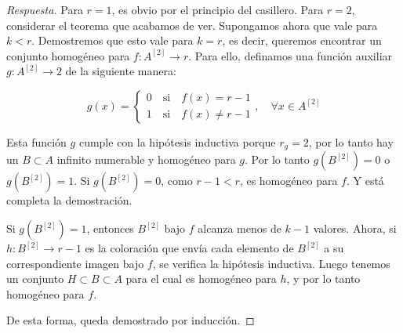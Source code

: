 \begin{proof}[Respuesta]
    Para $r=1$, es obvio por el principio del casillero. Para $r=2$, considerar el teorema que acabamos de ver. Supongamos ahora que vale para $k < r$. Demostremos que esto vale para $k = r$, es decir, queremos encontrar un conjunto homogéneo para $f: A^{[2]} \rightarrow r$. Para ello, definamos una función auxiliar $g: A^{[2]} \rightarrow 2$ de la siguiente manera:
    
    \[
    g(x) =
    \begin{cases}
        0 \quad \text{si} \quad f(x) = r-1 \\
        1 \quad \text{si} \quad f(x) \neq r-1
    \end{cases}, \quad \forall x \in A^{[2]}
    \]
    
    Esta función $g$ cumple con la hipótesis inductiva porque $r_g = 2$, por lo tanto hay un $B \subset A$ infinito numerable y homogéneo para $g$. Por lo tanto $g\left(B^{[2]}\right) = 0$ o $g\left(B^{[2]}\right) = 1$. Si $g\left(B^{[2]}\right) = 0$, como $r-1 < r$, es homogéneo para $f$. Y está completa la demostración.
    
    Si $g\left(B^{[2]}\right) = 1$, entonces $B^{[2]}$ bajo $f$ alcanza menos de $k-1$ valores. Ahora, si $h: B^{[2]} \rightarrow r-1$ es la coloración que envía cada elemento de $B^{[2]}$ a su correspondiente imagen bajo $f$, se verifica la hipótesis inductiva. Luego tenemos un conjunto $H \subset B \subset A$ para el cual es homogéneo para $h$, y por lo tanto homogéneo para $f$.
    
    De esta forma, queda demostrado por inducción.
\end{proof}